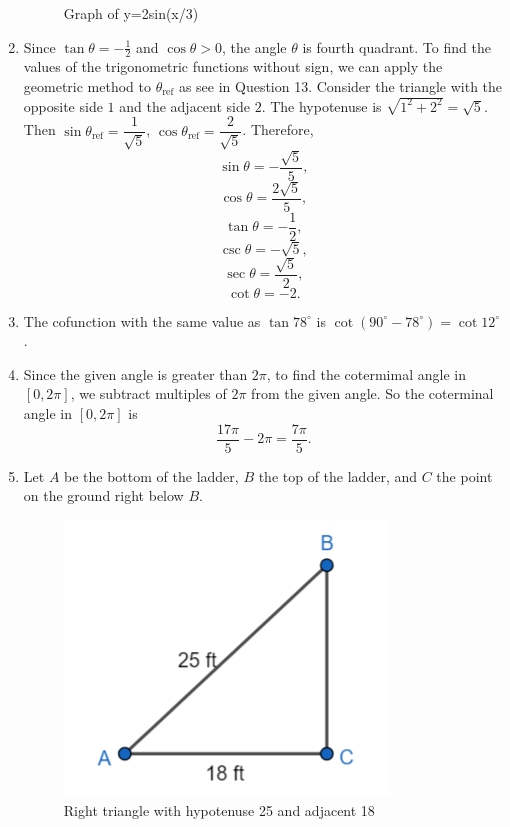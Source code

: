 \documentclass[
  12pt]{article}
\begin{document}
\begin{enumerate}
\begin{figure}[H]
{  }

  \caption{Graph of y=2sin(x/3)}

  \end{figure}%
\item
  Since \(\tan\theta = -\frac12\) and \(\cos\theta>0\), the angle
  \(\theta\) is fourth quadrant. To find the values of the trigonometric
  functions without sign, we can apply the geometric method to
  \(\theta_{\text{ref}}\) as see in Question 13. Consider the triangle
  with the opposite side \(1\) and the adjacent side \(2\). The
  hypotenuse is \(\sqrt{1^2+2^2}=\sqrt{5}\). Then
  \(\sin\theta_{\text{ref}} = \dfrac{1}{\sqrt{5}}\),
  \(\cos\theta_\text{ref} = \dfrac{2}{\sqrt{5}}\). Therefore,
  \[\sin\theta = -\dfrac{\sqrt{5}}{5},\]
  \[\cos\theta = \dfrac{2\sqrt{5}}{5},\] \[\tan\theta = -\dfrac{1}{2},\]
  \[\csc\theta = -\sqrt{5},\] \[\sec\theta = \dfrac{\sqrt{5}}{2},\]
  \[\cot\theta = -2.\]
\item
  The cofunction with the same value as \(\tan 78^\circ\) is
  \(\cot(90^\circ-78^\circ)=\cot 12^\circ\).
\item
  Since the given angle is greater than \(2\pi\), to find the cotermimal
  angle in \([0, 2\pi]\), we subtract multiples of \(2\pi\) from the
  given angle. So the coterminal angle in \([0, 2\pi]\) is
  \[\dfrac{17\pi}{5} - 2\pi = \dfrac{7\pi}{5}.\]
\item
  Let \(A\) be the bottom of the ladder, \(B\) the top of the ladder,
  and \(C\) the point on the ground right below \(B\).

  \begin{figure}[H]

  {\centering \includegraphics{Q23.jpeg}

  }

  \caption{Right triangle with hypotenuse 25 and adjacent 18}


\end{figure}
\end{enumerate}
\end{document}
